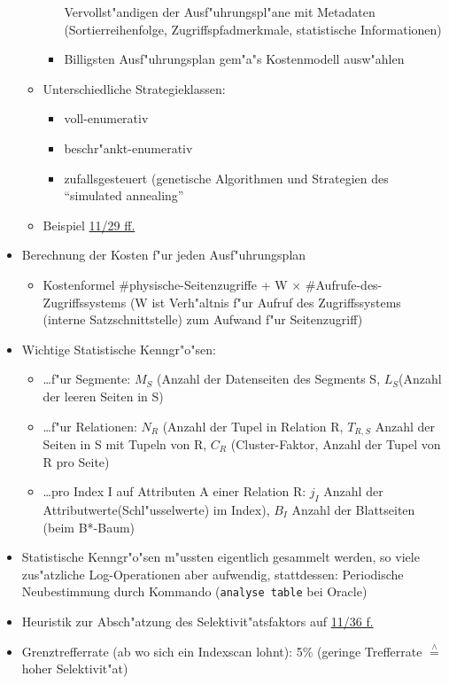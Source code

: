 \documentclass[a4paper, 12pt]{scrartcl}
\begin{document}
\begin{itemize}
\begin{itemize}
\begin{itemize}
						Vervollst"andigen der Ausf"uhrungspl"ane mit Metadaten (Sortierreihenfolge, Zugriffspfadmerkmale, statistische Informationen)
					\item
						Billigsten Ausf"uhrungsplan gem"a"s Kostenmodell ausw"ahlen
				\end{itemize}
			\item
				Unterschiedliche Strategieklassen: 
				\begin{itemize}
					\item
						voll-enumerativ
					\item
						beschr"ankt-enumerativ
					\item
						zufallsgesteuert (genetische Algorithmen und Strategien des \enquote{simulated annealing}
				\end{itemize}
			\item
				Beispiel \href{site:IDB-2015WS-11-RelOperatore.pdf}{11/29 ff.}
		\end{itemize}
	\item
		Berechnung der Kosten f"ur jeden Ausf"uhrungsplan
		\begin{itemize}
			\item
				Kostenformel \#physische-Seitenzugriffe + W $\times$ \#Aufrufe-des-Zugriffssystems (W ist Verh"altnis f"ur Aufruf des Zugriffssystems (interne Satzschnittstelle) zum Aufwand f"ur Seitenzugriff)
		\end{itemize}
	\item
		Wichtige Statistische Kenngr"o"sen:
		\begin{itemize}
			\item
				\dots f"ur Segmente: $M_S$ (Anzahl der Datenseiten des Segments S, $L_S$(Anzahl der leeren Seiten in S)
			\item
				\dots f"ur Relationen: $N_R$ (Anzahl der Tupel in Relation R, $T_{R,S}$ Anzahl der Seiten in S mit Tupeln von R, $C_R$ (Cluster-Faktor, Anzahl der Tupel von R pro Seite)
			\item
				\dots pro Index I auf Attributen A einer Relation R: $j_I$ Anzahl der Attributwerte(Schl"usselwerte) im Index), $B_I$ Anzahl der Blattseiten (beim B*-Baum)
		\end{itemize}
	\item
		Statistische Kenngr"o"sen m"ussten eigentlich gesammelt werden, so viele zus"atzliche Log-Operationen aber aufwendig, stattdessen: Periodische Neubestimmung durch Kommando (\lstinline$analyse table$ bei Oracle)

	\item
		Heuristik zur Absch"atzung des Selektivit"atsfaktors auf \href{site:IDB-2015WS-11-RelOperatore.pdf}{11/36 f.}
	\item
		Grenztrefferrate (ab wo sich ein Indexscan lohnt): 5\% (geringe Trefferrate $\overset{\wedge{}}=$ hoher Selektivit"at)
\end{itemize}
\end{document}

